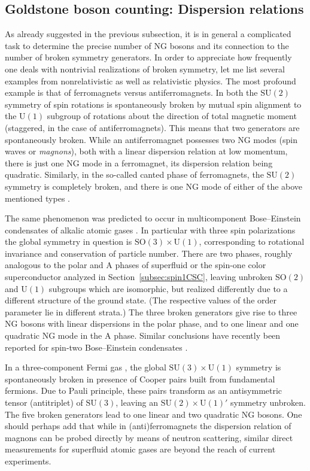 \documentclass[final,3p,times,12pt,a4paper,sort&compress]{elsarticle}
\newcommand\gr[1]{\mathrm{#1}}              %
\begin{document}
\subsection{Goldstone boson counting: Dispersion relations}
\label{subsec:GBdispersions} As already suggested in the previous subsection,
it is in general a complicated task to determine the precise number of NG
bosons and its connection to the number of broken symmetry generators. In order
to appreciate how frequently one deals with nontrivial realizations of broken
symmetry, let me list several examples from nonrelativistic as well as
relativistic physics. The most profound example is that of ferromagnets versus
antiferromagnets. In both the $\gr{SU(2)}$ symmetry of spin rotations is
spontaneously broken by mutual spin alignment to the $\gr{U(1)}$ subgroup of
rotations about the direction of total magnetic moment (staggered, in the case
of antiferromagnets). This means that two generators are spontaneously broken.
While an antiferromagnet possesses two NG modes (spin waves or \emph{magnons}),
both with a linear dispersion relation at low momentum, there is just one NG
mode in a ferromagnet, its dispersion relation being quadratic. Similarly, in
the so-called canted phase of ferromagnets, the $\gr{SU(2)}$ symmetry is
completely broken, and there is one NG mode of either of the above mentioned
types \cite{Sachdev:1996sa}.

The same phenomenon was predicted to occur in multicomponent Bose--Einstein
condensates of alkalic atomic gases \cite{Ho:1998ho,Ohmi:1998om}. In particular
with three spin polarizations the global symmetry in question is
$\gr{SO(3)\times U(1)}$, corresponding to rotational invariance and conservation
of particle number. There are two phases, roughly analogous to the polar and A
phases of superfluid  or the spin-one color superconductor
analyzed in Section~\ref{subsec:spin1CSC}, leaving unbroken $\gr{SO(2)}$ and
$\gr{U(1)}$ subgroups which are isomorphic, but realized differently due to a
different structure of the ground state. (The respective values of the order
parameter lie in different strata.) The three broken generators give rise to
three NG bosons with linear dispersions in the polar phase, and to one linear
and one quadratic NG mode in the A phase. Similar conclusions have recently
been reported for spin-two Bose--Einstein condensates \cite{Uchino:2009ya}.

In a three-component Fermi gas
\cite{Honerkamp:2003hh,Honerkamp:2004ho,He:2006ne}, the global $\gr{SU(3)\times
U(1)}$ symmetry is spontaneously broken in presence of Cooper pairs built from
fundamental fermions. Due to Pauli principle, these pairs transform as an
antisymmetric tensor (antitriplet) of $\gr{SU(3)}$, leaving an $\gr{SU(2)\times
U(1)}'$ symmetry unbroken. The five broken generators lead to one linear and two
quadratic NG bosons. One should perhaps add that while in (anti)ferromagnets the
dispersion relation of magnons can be probed directly by means of neutron
scattering, similar direct measurements for superfluid atomic gases are beyond
the reach of current experiments.
\end{document}
